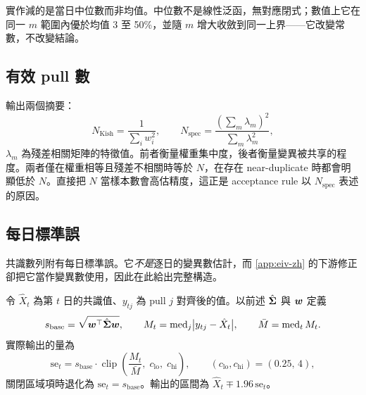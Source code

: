 \documentclass[12pt,a4paper,oneside]{article}
\begin{document}
\begin{remark}[中位數被減數]
實作減的是當日中位數而非均值。中位數不是線性泛函，無對應閉式；數值上它在同一 $m$ 範圍內優於均值 3 至 50\%，並隨 $m$ 增大收斂到同一上界——它改變常數，不改變結論。
\end{remark}

\subsection{有效 pull 數}

輸出兩個摘要：
\begin{equation}
N_{\text{Kish}}=\frac{1}{\sum_i w_i^2},
\qquad
N_{\text{spec}}=\frac{\left(\sum_{m}\lambda_m\right)^2}{\sum_{m}\lambda_m^2},
\end{equation}
$\lambda_m$ 為殘差相關矩陣的特徵值。前者衡量權重集中度，後者衡量變異被共享的程度。兩者僅在權重相等且殘差不相關時等於 $N$，在存在 near-duplicate 時都會明顯低於 $N$。直接把 $N$ 當樣本數會高估精度，這正是 acceptance rule 以 $N_{\text{spec}}$ 表述的原因。

\subsection{每日標準誤}\label{app:dailyse-zh}

共識數列附有每日標準誤。它\emph{不是}逐日的變異數估計，而 \cref{app:eiv-zh} 的下游修正卻把它當作變異數使用，因此在此給出完整構造。

令 $\hat{X}_t$ 為第 $t$ 日的共識值、$y_{tj}$ 為 pull $j$ 對齊後的值。以前述 $\hat{\bm{\Sigma}}$ 與 $\bm{w}$ 定義
\begin{equation}
s_{\text{base}}=\sqrt{\bm{w}^{\top}\hat{\bm{\Sigma}}\bm{w}},
\qquad
M_t=\operatorname{med}_j\bigl|y_{tj}-\hat{X}_t\bigr|,
\qquad
\bar{M}=\operatorname{med}_t M_t .
\end{equation}
實際輸出的量為
\begin{equation}
\mathrm{se}_t
= s_{\text{base}}\cdot
\operatorname{clip}\!\left(\frac{M_t}{\bar{M}},\;c_{\text{lo}},\;c_{\text{hi}}\right),
\qquad (c_{\text{lo}},c_{\text{hi}})=(0.25,\,4),
\label{eq:dailyse-zh}
\end{equation}
關閉區域項時退化為 $\mathrm{se}_t=s_{\text{base}}$。輸出的區間為 $\hat{X}_t\mp 1.96\,\mathrm{se}_t$。
\end{document}
